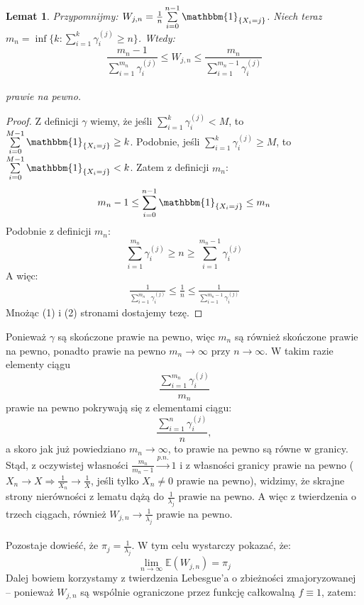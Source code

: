 \documentclass[a4paper]{article}
\theoremstyle{defn}
\theoremstyle{theorem}
\theoremstyle{lemma}
\newtheorem{lemma}[defn]{Lemat}
\theoremstyle{cor}
\theoremstyle{fact}
\begin{document}
\begin{lemma}\label{lemma2.5.12}
Przypomnijmy: $W_{j, n} = \frac{1}{n}\sum\limits_{i = 0}^{n-1} \mathbbm{1}_{\{X_i = j\}}$. Niech teraz $m_n = \inf \{k: \sum\limits_{i=1}^k \gamma_i^{(j)} \geq n\}$. Wtedy:
$$ \frac{m_n - 1}{\sum\limits_{i=1}^{m_n} \gamma_i^{(j)}} \leq W_{j, n}  \leq \frac{m_n}{\sum\limits_{i=1}^{m_n-1} \gamma_i^{(j)}}$$\\
prawie na pewno.
\end{lemma}
\begin{proof}
Z definicji $\gamma$ wiemy, że jeśli $\sum\limits_{i=1}^k \gamma_i^{(j)} < M$, to $\sum\limits_{i = 0}^{M-1} \mathbbm{1}_{\{X_i = j\}} \geq k$. Podobnie, jeśli $\sum\limits_{i=1}^k \gamma_i^{(j)} \geq M$, to $\sum\limits_{i = 0}^{M-1} \mathbbm{1}_{\{X_i = j\}} < k$. Zatem z definicji $m_n$:
\begin{align}
m_n - 1 \leq \sum\limits_{i = 0}^{n-1} \mathbbm{1}_{\{X_i = j\}} \leq m_n
\end{align}
Podobnie z definicji $m_n$:
$$\sum\limits_{i=1}^{m_n} \gamma_i^{(j)} \geq n \geq \sum\limits_{i=1}^{m_n - 1} \gamma_i^{(j)}$$
A więc:
\begin{align}
     \frac{1}{\sum\limits_{i=1}^{m_n} \gamma_i^{(j)}} \leq \frac{1}{n} \leq \frac{1}{\sum\limits_{i=1}^{m_n - 1} \gamma_i^{(j)}}
\end{align}
Mnożąc (1) i (2) stronami dostajemy tezę.
\end{proof}
Ponieważ $\gamma$ są skończone prawie na pewno, więc $m_n$ są również skończone prawie na pewno, ponadto prawie na pewno $m_n \to \infty$ przy $n \to \infty$. W takim razie elementy ciągu 
$$\frac{\sum\limits_{i=1}^{m_n} \gamma_i^{(j)}}{m_n}$$
prawie na pewno pokrywają się z elementami ciągu:
$$\frac{\sum\limits_{i=1}^{n} \gamma_i^{(j)}}{n},$$
a skoro jak już powiedziano $m_n \to \infty$, to prawie na pewno są równe w granicy.
Stąd, z oczywistej własności $\frac{m_n}{m_n-1} \overset{p.n.}{\to} 1$ i z własności granicy prawie na pewno ($ X_n \to X \Rightarrow \frac{1}{X_n} \to \frac{1}{X}$, jeśli tylko $X_n \neq 0$ prawie na pewno), widzimy, że skrajne strony nierówności z lematu dążą do $\frac{1}{\lambda_j}$ prawie na pewno. A więc z twierdzenia o trzech ciągach, również $W_{j,n} \to \frac{1}{\lambda_j}$ prawie na pewno.\\
\\
Pozostaje dowieść, że $\pi_j = \frac{1}{\lambda_j}$. W tym celu wystarczy pokazać, że:
$$ \lim\limits_{n \to \infty} \mathbb{E}(W_{j,n}) = \pi_j$$ Dalej bowiem korzystamy z twierdzenia Lebesgue'a o zbieżności zmajoryzowanej – ponieważ $W_{j,n}$ są wspólnie ograniczone przez funkcję całkowalną $f \equiv 1$, zatem:
\end{document}
